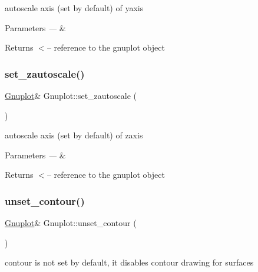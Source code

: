 autoscale axis (set by default) of yaxis


\begin{DoxyParams}{Parameters}
{\em ---} & \\
\hline
\end{DoxyParams}
\begin{DoxyReturn}{Returns}
$<$-- reference to the gnuplot object 
\end{DoxyReturn}
\mbox{\label{class_gnuplot_aef3e84e793836158e1ddd773d1465c37}} 
\subsubsection{\texorpdfstring{set\+\_\+zautoscale()}{set\_zautoscale()}}
{\footnotesize\ttfamily \hyperlink{class_gnuplot}{Gnuplot}\& Gnuplot\+::set\+\_\+zautoscale (\begin{DoxyParamCaption}{ }\end{DoxyParamCaption})\hspace{0.3cm}{\ttfamily [inline]}}

autoscale axis (set by default) of zaxis


\begin{DoxyParams}{Parameters}
{\em ---} & \\
\hline
\end{DoxyParams}
\begin{DoxyReturn}{Returns}
$<$-- reference to the gnuplot object 
\end{DoxyReturn}
\mbox{\label{class_gnuplot_a0b8522cb81e46dd4f5a22b7b48f977b1}} 
\subsubsection{\texorpdfstring{unset\+\_\+contour()}{unset\_contour()}}
{\footnotesize\ttfamily \hyperlink{class_gnuplot}{Gnuplot}\& Gnuplot\+::unset\+\_\+contour (\begin{DoxyParamCaption}{ }\end{DoxyParamCaption})\hspace{0.3cm}{\ttfamily [inline]}}

contour is not set by default, it disables contour drawing for surfaces


